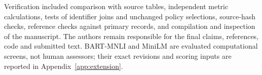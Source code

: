 \documentclass[manuscript,screen,review,anonymous]{acmart}
\begin{document}
Verification included comparison with source tables, independent metric calculations, tests of identifier joins and unchanged policy selections, source-hash checks, reference checks against primary records, and compilation and inspection of the manuscript. The authors remain responsible for the final claims, references, code and submitted text. BART-MNLI and MiniLM are evaluated computational screens, not human assessors; their exact revisions and scoring inputs are reported in Appendix~\ref{app:extension}.

\clearpage


\clearpage
\appendix

\end{document}
